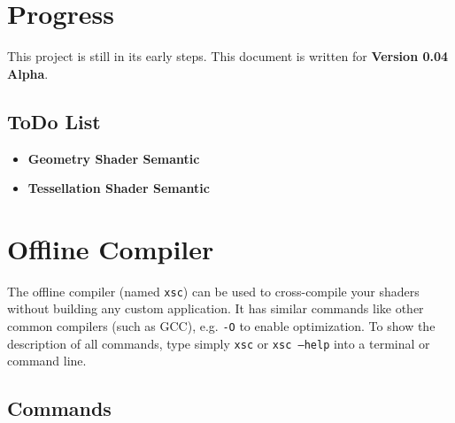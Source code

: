 \documentclass{article}
\begin{document}
\newpage
\section{Progress}

This project is still in its early steps. This document is written for \XSC \textbf{Version 0.04 Alpha}.

\subsection{ToDo List}
\begin{itemize}
	\item \textbf{Geometry Shader Semantic}
	\item \textbf{Tessellation Shader Semantic}
\end{itemize}



\newpage
\section{Offline Compiler}

The offline compiler (named \texttt{xsc}) can be used to cross-compile your shaders without building any custom application.
It has similar commands like other common compilers (such as GCC), e.g. \texttt{-O} to enable optimization.
To show the description of all commands, type simply \texttt{xsc} or \texttt{xsc --help} into a terminal or command line.

\subsection{Commands}
\end{document}
